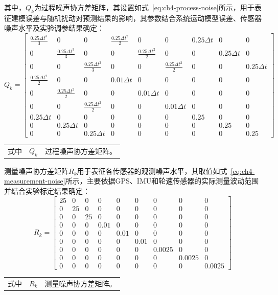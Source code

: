 其中，$Q_k$为过程噪声协方差矩阵，其设置如式~\eqref{eq:ch4-process-noise}所示，用于表征建模误差与随机扰动对预测结果的影响，其参数结合系统运动模型误差、传感器噪声水平及实验调参结果确定：
\begin{equation}
\label{eq:ch4-process-noise}
Q_{k} = \begin{bmatrix}
\frac{0.25\Delta t^{3}}{3} & 0 & 0 & \frac{0.25\Delta t^{2}}{2} & 0 & 0 & 0.25\Delta t & 0 & 0 \\
0 & \frac{0.25\Delta t^{3}}{3} & 0 & 0 & \frac{0.25\Delta t^{2}}{2} & 0 & 0 & 0.25\Delta t & 0 \\
0 & 0 & \frac{0.25\Delta t^{3}}{3} & 0 & 0 & \frac{0.25\Delta t^{2}}{2} & 0 & 0 & 0.25\Delta t \\
\frac{0.25\Delta t^{2}}{2} & 0 & 0 & 0.01\Delta t & 0 & 0 & 0 & 0 & 0 \\
0 & \frac{0.25\Delta t^{2}}{2} & 0 & 0 & 0.01\Delta t & 0 & 0 & 0 & 0 \\
0 & 0 & \frac{0.25\Delta t^{2}}{2} & 0 & 0 & 0.01\Delta t & 0 & 0 & 0 \\
0.25\Delta t & 0 & 0 & 0 & 0 & 0 & 0.25 & 0 & 0 \\
0 & 0.25\Delta t & 0 & 0 & 0 & 0 & 0 & 0.25 & 0 \\
0 & 0 & 0.25\Delta t & 0 & 0 & 0 & 0 & 0 & 0.25
\end{bmatrix}
\end{equation}
\begin{tabularx}{\textwidth}{@{}l@{\quad}r@{———}X@{}}
式中& $Q_k$ & 过程噪声协方差矩阵。\\
\end{tabularx}\vspace{3.15bp}

测量噪声协方差矩阵$R_k$用于表征各传感器的观测噪声水平，其取值如式~\eqref{eq:ch4-measurement-noise}所示，主要依据GPS、IMU和轮速传感器的实际测量波动范围并结合实验标定结果确定：
\begin{equation}
\label{eq:ch4-measurement-noise}
R_{k} = \begin{bmatrix}
25 & 0 & 0 & 0 & 0 & 0 & 0 & 0 & 0 \\
0 & 25 & 0 & 0 & 0 & 0 & 0 & 0 & 0 \\
0 & 0 & 25 & 0 & 0 & 0 & 0 & 0 & 0 \\
0 & 0 & 0 & 0.01 & 0 & 0 & 0 & 0 & 0 \\
0 & 0 & 0 & 0 & 0.01 & 0 & 0 & 0 & 0 \\
0 & 0 & 0 & 0 & 0 & 0.01 & 0 & 0 & 0 \\
0 & 0 & 0 & 0 & 0 & 0 & 0.0025 & 0 & 0 \\
0 & 0 & 0 & 0 & 0 & 0 & 0 & 0.0025 & 0 \\
0 & 0 & 0 & 0 & 0 & 0 & 0 & 0 & 0.0025
\end{bmatrix}
\end{equation}
\begin{tabularx}{\textwidth}{@{}l@{\quad}r@{———}X@{}}
式中& $R_k$ & 测量噪声协方差矩阵。\\
\end{tabularx}\vspace{3.15bp}

